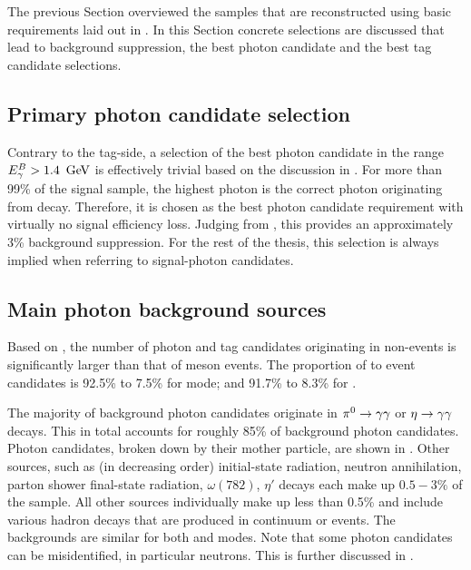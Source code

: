 The previous Section overviewed the samples that are reconstructed using basic requirements laid out in .
In this Section concrete selections are discussed that lead to background suppression, the best photon candidate
and the best tag candidate selections.

\subsection{Primary photon candidate selection}\label{sec:primary_photon_candidate_selection}
Contrary to the tag-side, a selection of the best photon candidate in the range ${E^B_{\gamma}}>1.4~\mathrm{\,Ge\kern -0.1em V}$ 
is effectively trivial based on the discussion in .
For more than 99\% of the signal \MC sample, the highest \EB photon 
is the correct photon originating from \BtoXsgamma decay.
Therefore, it is chosen as the best photon candidate requirement with virtually no signal efficiency loss.
Judging from , this provides an approximately 3\% background suppression.
For the rest of the thesis, this selection is always implied when referring to signal-photon candidates.

\subsection{Main photon background sources}\label{sec:main_background_sources}

Based on , the number of photon and tag candidates originating 
in non-\BB events is significantly larger than that of \B meson events.
The proportion of \qqbar to \BB event candidates is 92.5\% to 7.5\% for \feiBp mode;
and 91.7\% to 8.3\% for \feiBz.

The majority of background photon candidates originate in $\pi^0\rightarrow\gamma\gamma$ or $\eta\rightarrow\gamma\gamma$ decays.
This in total accounts for roughly 85\% of background photon candidates.
Photon candidates, broken down by their mother particle, are shown in .
Other sources, such as (in decreasing order) initial-state radiation, neutron annihilation, parton shower final-state radiation, $\omega(782)$, $\eta'$ decays each make up $0.5-3\%$ of the sample.
All other sources individually make up less than 0.5\% and include various hadron decays that are produced in continuum or \B events.
The backgrounds are similar for both \feiBp and \feiBz modes.
Note that some photon candidates can be misidentified, in particular neutrons. 
This is further discussed in .

